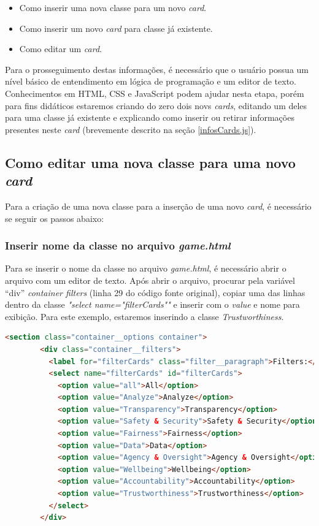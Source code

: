 \begin{itemize}
    \item Como inserir uma nova classe para um novo \textit{card}.
    \item Como inserir um novo \textit{card} para classe já existente.
    \item Como editar um \textit{card}.
\end{itemize}

Para o prosseguimento destas informações, é necessário que o usuário possua um nível básico de entendimento em lógica de programação e um editor de texto. Conhecimentos em \acrshort{HTML}, \acrshort{CSS} e JavaScript podem ajudar nesta etapa, porém para fins didáticos estaremos criando do zero dois novs \textit{cards}, editando um deles para uma classe já existente e explicando como inserir ou retirar informações presentes neste \textit{card} (brevemente descrito na seção \ref{infosCards.js}).

\subsection{Como editar uma nova classe para uma novo \textit{card}}
Para a criação de uma nova classe para a inserção de uma novo \textit{card}, é necessário se seguir os passos abaixo:

\subsubsection{Inserir nome da classe no arquivo \textit{game.html}}
Para se inserir o nome da classe no arquivo \textit{game.html}, é necessário abrir o arquivo com um editor de texto. Após abrir o arquivo, procurar pela variável ``div'' \textit{container filters} (linha 29 do código fonte original), copiar uma das linhas dentro da classe \textit{"select name="filterCards""} e inserir com o \textit{value} e nome para exibição. Para este exemplo, estaremos inserindo a classe \textit{Trustworthiness}.

\begin{lstlisting}[language=HTML, caption=Classe \textit{Trustworthiness} inserida na linha 14]
<section class="container__options container">
        <div class="container__filters">
          <label for="filterCards" class="filter__paragraph">Filters:</label>
          <select name="filterCards" id="filterCards">
            <option value="all">All</option>
            <option value="Analyze">Analyze</option>
            <option value="Transparency">Transparency</option>
            <option value="Safety & Security">Safety & Security</option>
            <option value="Fairness">Fairness</option>
            <option value="Data">Data</option>
            <option value="Agency & Oversight">Agency & Oversight</option>
            <option value="Wellbeing">Wellbeing</option>
            <option value="Accountability">Accountability</option>
            <option value="Trustworthiness">Trustworthiness</option>
          </select>
        </div>
\end{lstlisting}

